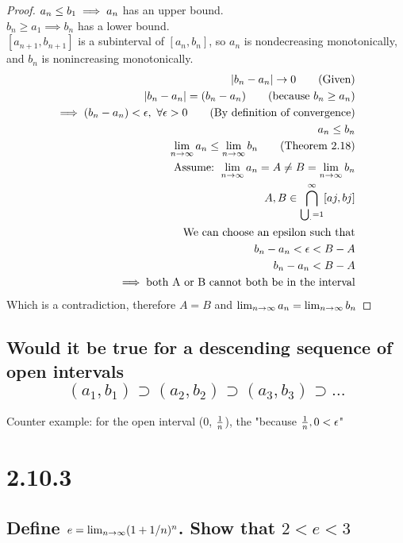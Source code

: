 \documentclass[11pt]{article}
\begin{document}
	
	\begin{proof} 
		$\\a_n \leq b_1 \implies a_n$ has an upper bound. \\
		$b_n \geq a_1 \implies b_n$ has a lower bound. \\
		$[a_{n+1}, b_{n+1}]$ is a subinterval of $[a_n, b_n]$, so $a_n$ is nondecreasing monotonically, and $b_n$ is nonincreasing monotonically. \\
		
		\begin{align*} %
		|b_n - a_n| \rightarrow 0 \tag{Given} \\
		|b_n - a_n | = (b_n - a_n) \tag{because $b_n \geq a_n$} \\
		\implies (b_n - a_n) < \epsilon,\ \forall \epsilon > 0 \tag{By definition of convergence}\\
		a_n \leq b_n \\ 
		\limittoinfyn{a_n} \leq \limittoinfyn{b_n} \tag{Theorem 2.18} \\
		\text{Assume: } \limittoinfyn{a_n} = A \ne B = \limittoinfyn{b_n} \\
		A, B \in \bigcap _{{\bigcup }_{\cdot }=1}^{\infty} [aj, bj] \\
		\text{We can choose an epsilon such that} \\
		b_n - a_n < \epsilon < B - A \\
		b_n - a_n < B - A \\
		\implies \text{both A or B cannot both be in the interval} \\
		\end{align*}
		Which is a contradiction, therefore $A = B$ and $\lim_{n \to \infty}a_n = \lim_{n \to \infty}b_n$
	\end{proof}
	
	\subsection*{Would it be true for a descending sequence of open intervals $$(a_1, b_1) \supset (a_2, b_2) \supset (a_3, b_3) \supset \dots $$}
		Counter example: for the open interval (0, $\frac{1}{n}$), the  "because $\frac{1}{n}, 0 < \epsilon$"
	
	\section*{2.10.3} \subsection*{Define $e = \lim_{n \to \infty}(1 + 1/n)^n$. Show that $2 < e < 3$}
	
\end{document}
